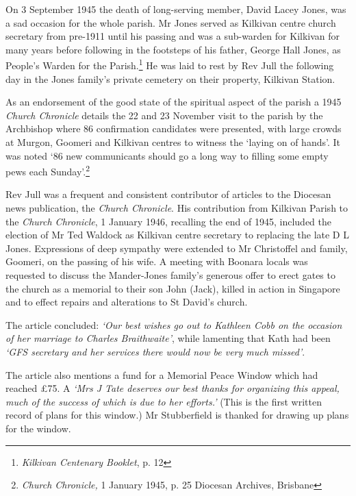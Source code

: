 On 3 September 1945 the death of long-serving member, David Lacey Jones, was a sad occasion for the whole parish. Mr Jones served as Kilkivan centre church secretary from pre-1911 until his passing and was a sub-warden for Kilkivan for many years before following in the footsteps of his father, George Hall Jones, as People's Warden for the Parish.\footnote{\emph{Kilkivan Centenary Booklet}, p. 12} He was laid to rest by Rev Jull the following day in the Jones family's private cemetery on their property, Kilkivan Station.


As an endorsement of the good state of the spiritual aspect of the parish a 1945 \emph{Church Chronicle} details the 22 and 23 November visit to the parish by the Archbishop where 86 confirmation candidates were presented, with large crowds at Murgon, Goomeri and Kilkivan centres to witness the `laying on of hands'. It was noted `86 new communicants should go a long way to filling some empty pews each Sunday'.\footnote{\emph{Church Chronicle,} 1 January 1945, p. 25 Diocesan Archives, Brisbane}


Rev Jull was a frequent and consistent contributor of articles to the Diocesan news publication, the \emph{Church Chronicle}. His contribution from Kilkivan Parish to the \emph{Church Chronicle}, 1 January 1946, recalling the end of 1945, included the election of Mr Ted Waldock as Kilkivan centre secretary to replacing the late D L Jones. Expressions of deep sympathy were extended to Mr Christoffel and family, Goomeri, on the passing of his wife. A meeting with Boonara locals was requested to discuss the Mander-Jones family's generous offer to erect gates to the church as a memorial to their son John (Jack), killed in action in Singapore and to effect repairs and alterations to St David's church.



The article concluded: \emph{`Our best wishes go out to Kathleen Cobb on the occasion of her marriage to Charles Braithwaite'}, while lamenting that Kath had been \emph{`GFS secretary and her services there would now be very much missed'}.



The article also mentions a fund for a Memorial Peace Window which had reached \pounds75. A \emph{`Mrs J Tate deserves our best thanks for organizing this appeal, much of the success of which is due to her efforts.'} (This is the first written record of plans for this window.) Mr Stubberfield is thanked for drawing up plans for the window.



